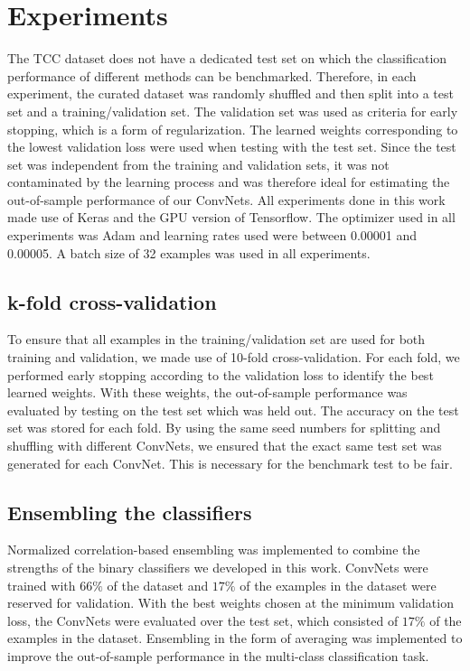 \documentclass[conference]{IEEEtran}
\begin{document}
\section{Experiments} \label{section:experiments}
The TCC dataset does not have a dedicated test set on which the classification performance of different methods can be benchmarked. Therefore, in each experiment, the curated dataset was randomly shuffled and then split into a test set and a training/validation set. The validation set was used as criteria for early stopping, which is a form of regularization. The learned weights corresponding to the lowest validation loss were used when testing with the test set. Since the test set was independent from the training and validation sets, it was not contaminated by the learning process and was therefore ideal for estimating the out-of-sample performance of our ConvNets. All experiments done in this work made use of Keras \cite{keras} and the GPU version of Tensorflow. The optimizer used in all experiments was Adam and learning rates used were between 0.00001 and 0.00005. A batch size of 32 examples was used in all experiments.

\subsection{k-fold cross-validation}
To ensure that all examples in the training/validation set are used for both training and validation, we made use of 10-fold cross-validation. For each fold, we performed early stopping according to the validation loss to identify the best learned weights. With these weights, the out-of-sample performance was evaluated by testing on the test set which was held out. The accuracy on the test set was stored for each fold. By using the same seed numbers for splitting and shuffling with different ConvNets, we ensured that the exact same test set was generated for each ConvNet. This is necessary for the benchmark test to be fair.

\subsection{Ensembling the classifiers}
Normalized correlation-based ensembling was implemented to combine the strengths of the binary classifiers we developed in this work. ConvNets were trained with $66\%$ of the dataset and $17\%$ of the examples in the dataset were reserved for validation. With the best weights chosen at the minimum validation loss, the ConvNets were evaluated over the test set, which consisted of $17\%$ of the examples in the dataset. Ensembling in the form of averaging was implemented to improve the out-of-sample performance in the multi-class classification task.
\end{document}
